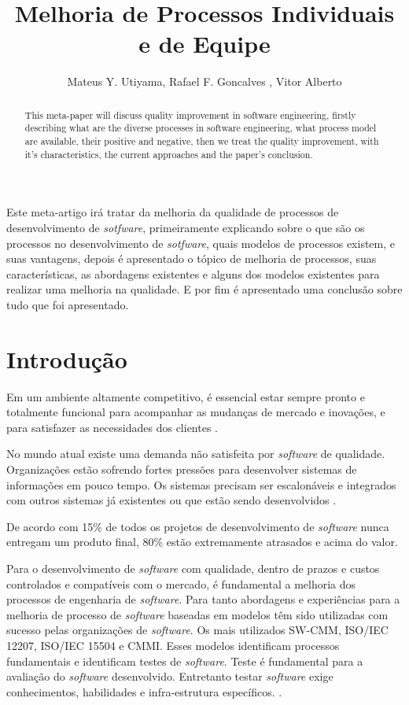 \documentclass[12pt]{article}
\title{Melhoria de Processos Individuais e de Equipe}
\author{Mateus Y. Utiyama\inst{1}, Rafael F. Goncalves \inst{1}, Vitor Alberto\inst{1}}
\begin{document}
 

\maketitle

\begin{abstract}
  This meta-paper will discuss quality improvement in software engineering, firstly describing what are the diverse processes in software engineering, what process model are available, their positive and negative, then we treat the quality improvement, with it's characteristics, the current approaches and the paper's conclusion. 
\end{abstract}
     
\begin{resumo} 
  Este meta-artigo irá tratar da melhoria da qualidade de processos de desenvolvimento de \textit{sotfware}, primeiramente explicando sobre o que são os processos no desenvolvimento de \textit{sotfware}, quais modelos de processos existem, e suas vantagens, depois é apresentado o tópico de melhoria de processos, suas características, as abordagens existentes e alguns dos modelos existentes para realizar uma melhoria na qualidade. E por fim é apresentado uma conclusão sobre tudo que foi apresentado.
\end{resumo}


\section{Introdução}

    Em um ambiente altamente competitivo, é essencial estar sempre pronto e totalmente funcional para acompanhar as mudanças de mercado e inovações, e para satisfazer as necessidades dos clientes \cite{buyukozkan2005group}. 
    
    No mundo atual existe uma demanda não satisfeita por \textit{software} de qualidade. Organizações estão sofrendo fortes pressões para desenvolver sistemas de informações em pouco tempo. Os sistemas precisam ser escalonáveis e integrados com outros sistemas já existentes ou que estão sendo desenvolvidos \cite{crespo2004metodologia}.
    
    De acordo com \cite{jiang2004exploration} 15\% de todos os projetos de desenvolvimento de \textit{software} nunca entregam um produto final, 80\% estão extremamente atrasados e acima do valor. 
    
    Para o desenvolvimento de \textit{software} com qualidade, dentro de prazos e custos controlados e compatíveis com o mercado, é fundamental a melhoria dos processos de engenharia de \textit{software}. Para tanto abordagens e experiências para a melhoria de processo de \textit{software} baseadas em modelos têm sido utilizadas com sucesso pelas organizações de \textit{software}. Os mais utilizados SW-CMM, ISO/IEC 12207, ISO/IEC 15504 e CMMI. Esses modelos identificam processos fundamentais e identificam testes de \textit{software}. Teste é fundamental para a avaliação do \textit{software} desenvolvido. Entretanto testar \textit{software} exige conhecimentos, habilidades e infra-estrutura específicos. \cite{crespo2004metodologia}. 
 
\end{document}
